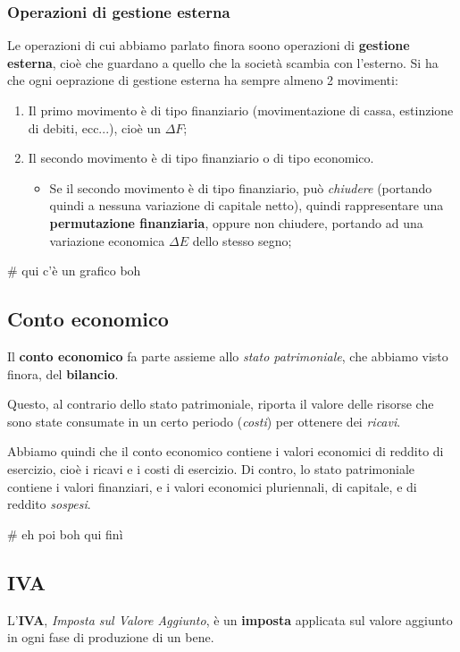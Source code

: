\documentclass[a4paper,11pt]{article}
\begin{document}
\subsubsection{Operazioni di gestione esterna}
Le operazioni di cui abbiamo parlato finora soono operazioni di \textbf{gestione esterna}, cioè che guardano a quello che la società scambia con l'esterno.
Si ha che ogni oeprazione di gestione esterna ha sempre almeno 2 movimenti:
\begin{enumerate}
	\item Il primo movimento è di tipo finanziario (movimentazione di cassa, estinzione di debiti, ecc...), cioè un $\Delta F$;
	\item Il secondo movimento è di tipo finanziario o di tipo economico.
		\begin{itemize}
			\item Se il secondo movimento è di tipo finanziario, può \textit{chiudere} (portando quindi a nessuna variazione di capitale netto), quindi rappresentare una \textbf{permutazione finanziaria}, oppure non chiudere, portando ad una variazione economica $\Delta E$ dello stesso segno;
		\end{itemize}
\end{enumerate}

# qui c'è un grafico boh

\subsection{Conto economico}
Il \textbf{conto economico} fa parte assieme allo \textit{stato patrimoniale}, che abbiamo visto finora, del \textbf{bilancio}.

Questo, al contrario dello stato patrimoniale, riporta il valore delle risorse che sono state consumate in un certo periodo (\textit{costi}) per ottenere dei \textit{ricavi}.

Abbiamo quindi che il conto economico contiene i valori economici di reddito di esercizio, cioè i ricavi e i costi di esercizio.
Di contro, lo stato patrimoniale contiene i valori finanziari, e i valori economici pluriennali, di capitale, e di reddito \textit{sospesi}.

# eh poi boh qui finì

\subsection{IVA}
L'\textbf{IVA}, \textit{Imposta sul Valore Aggiunto}, è un \textbf{imposta} applicata sul valore aggiunto in ogni fase di produzione di un bene.
\end{document}
